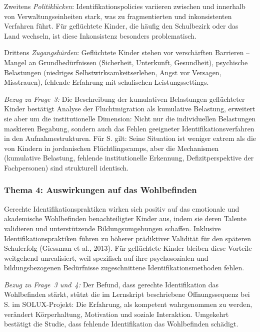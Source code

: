 \documentclass[ngerman, a4paper]{article}
\begin{document}
Zweitens \textit{Politiklücken}: Identifikationspolicies variieren
zwischen und innerhalb von Verwaltungseinheiten stark, was zu
fragmentierten und inkonsistenten Verfahren führt. Für geflüchtete Kinder,
die häufig den Schulbezirk oder das Land wechseln, ist diese Inkonsistenz
besonders problematisch.

Drittens \textit{Zugangshürden}: Geflüchtete Kinder stehen vor
verschärften Barrieren -- Mangel an Grundbedürfnissen (Sicherheit,
Unterkunft, Gesundheit), psychische Belastungen (niedriges
Selbstwirksamkeitserleben, Angst vor Versagen, Misstrauen), fehlende
Erfahrung mit schulischen Leistungssettings.

\textit{Bezug zu Frage~3:} Die Beschreibung der kumulativen Belastungen
geflüchteter Kinder bestätigt \textcite{behrensen2019inklusive} Analyse
der Fluchtmigration als kumulative Belastung, erweitert sie aber um die
institutionelle Dimension: Nicht nur die individuellen Belastungen
maskieren Begabung, sondern auch das Fehlen geeigneter
Identifikationsverfahren in den Aufnahmestrukturen. Für S. gilt: Seine
Situation ist weniger extrem als die von Kindern in jordanischen
Flüchtlingscamps, aber die Mechanismen (kumulative Belastung, fehlende
institutionelle Erkennung, Defizitperspektive der Fachpersonen) sind
strukturell identisch.

\subsubsection*{Thema 4: Auswirkungen auf das Wohlbefinden}

Gerechte Identifikationspraktiken wirken sich positiv auf das emotionale
und akademische Wohlbefinden benachteiligter Kinder aus, indem sie deren
Talente validieren und unterstützende Bildungsumgebungen schaffen. Inklusive
Identifikationspraktiken führen zu höherer prädiktiver Validität für den
späteren Schulerfolg (Giessman et al., 2013). Für geflüchtete Kinder
bleiben diese Vorteile weitgehend unrealisiert, weil spezifisch auf ihre
psychosozialen und bildungsbezogenen Bedürfnisse zugeschnittene
Identifikationsmethoden fehlen.

\textit{Bezug zu Frage~3 und~4:} Der Befund, dass gerechte Identifikation
das Wohlbefinden stärkt, stützt die im Lernskript beschriebene
Öffnungssequenz bei S. im SOLUX-Projekt: Die Erfahrung, als kompetent
wahrgenommen zu werden, verändert Körperhaltung, Motivation und soziale
Interaktion. Umgekehrt bestätigt die Studie, dass fehlende Identifikation
das Wohlbefinden schädigt.
\end{document}
